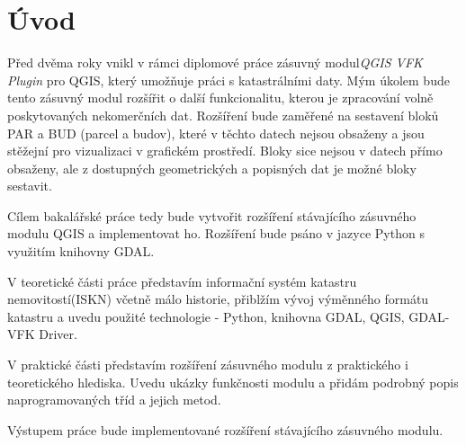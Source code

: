 \chapter{Úvod}
\label{1-uvod}


Před dvěma roky vnikl v rámci diplomové práce zásuvný modul\textit{QGIS VFK Plugin} pro QGIS, který umožňuje práci s katastrálními daty. Mým úkolem bude tento zásuvný modul rozšířit o další funkcionalitu, kterou je zpracování volně poskytovaných nekomerčních dat. Rozšíření bude zaměřené na sestavení bloků PAR a BUD (parcel a budov), které v těchto datech nejsou obsaženy a jsou stěžejní pro vizualizaci v grafickém prostředí. Bloky sice nejsou v datech přímo obsaženy, ale z dostupných geometrických a popisných dat je možné bloky sestavit.

Cílem bakalářské práce tedy bude vytvořit rozšíření stávajícího zásuvného modulu QGIS a implementovat ho. Rozšíření bude psáno v jazyce Python s využitím knihovny GDAL. 

V teoretické části práce představím informační systém katastru nemovitostí(ISKN) včetně málo historie, přiblžím vývoj výměnného formátu katastru a uvedu
použité technologie - Python, knihovna GDAL, QGIS, GDAL-VFK Driver.

V praktické části představím rozšíření zásuvného modulu z praktického i teoretického hlediska. Uvedu ukázky funkčnosti modulu a přidám podrobný popis naprogramovaných tříd a jejich metod.

Výstupem práce bude implementované rozšíření stávajícího zásuvného modulu.


